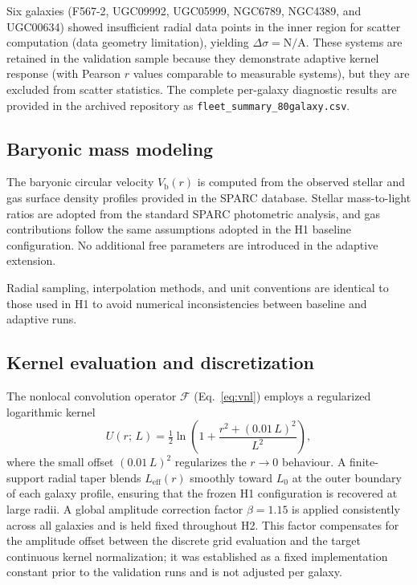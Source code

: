 \documentclass{aa}
\begin{document}
Six galaxies (F567-2, UGC09992, UGC05999, NGC6789, NGC4389, and UGC00634)
showed insufficient radial data points in the inner region
for scatter computation (data geometry limitation), yielding $\Delta\sigma
= \mathrm{N/A}$. These systems are retained in the validation sample because they
demonstrate adaptive kernel response (with Pearson $r$ values comparable
to measurable systems), but they are excluded from scatter statistics. The
complete per-galaxy diagnostic results are provided in the archived
repository as \texttt{fleet\_summary\_80galaxy.csv}.

\subsection{Baryonic mass modeling}

The baryonic circular velocity $V_{\mathrm{b}}(r)$ is computed from the 
observed stellar and gas surface density profiles provided in the SPARC 
database. Stellar mass-to-light ratios are adopted from the standard SPARC 
photometric analysis, and gas contributions follow the same assumptions 
adopted in the H1 baseline configuration. No additional free parameters 
are introduced in the adaptive extension.

Radial sampling, interpolation methods, and unit conventions are identical 
to those used in H1 to avoid numerical inconsistencies between baseline 
and adaptive runs.

\subsection{Kernel evaluation and discretization}

The nonlocal convolution operator $\mathcal{F}$ (Eq.~\ref{eq:vnl}) employs
a regularized logarithmic kernel
\begin{equation}
	U(r;\,L) = \tfrac{1}{2}\ln\!\left(1 + \frac{r^2 + (0.01\,L)^2}{L^2}\right),
	\label{eq:kernel}
\end{equation}
where the small offset $(0.01\,L)^2$ regularizes the $r \to 0$ behaviour.
A finite-support radial taper blends $L_{\mathrm{eff}}(r)$ smoothly toward
$L_0$ at the outer boundary of each galaxy profile, ensuring that the
frozen H1 configuration is recovered at large radii. A global amplitude
correction factor $\beta = 1.15$ is applied consistently across all
galaxies and is held fixed throughout H2. This factor compensates for
the amplitude offset between the discrete grid evaluation and the target
continuous kernel normalization; it was established as a fixed
implementation constant prior to the validation runs and is not adjusted
per galaxy.
\end{document}
